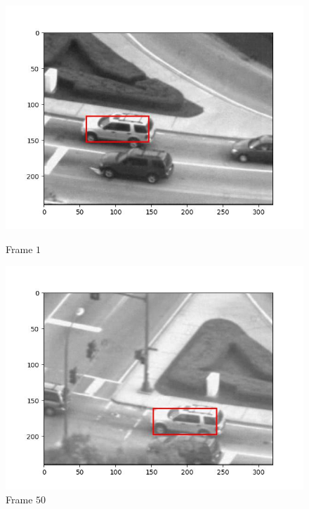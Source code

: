 \begin{figure}[H]
  \centering
  \begin{minipage}{.49\textwidth}
    \centering
    \includegraphics[width=\textwidth]{./figures/lk_affine/car2/frame000001.jpg}
    \caption{Frame $1$}
  \end{minipage}
  \hfill
  \begin{minipage}{.49\textwidth}
    \centering
    \includegraphics[width=\textwidth]{./figures/lk_affine/car2/frame000050.jpg}
    \caption{Frame $50$}
  \end{minipage}
  \hfill
  \begin{minipage}{.49\textwidth}
    \centering

\end{minipage}
\end{figure}

